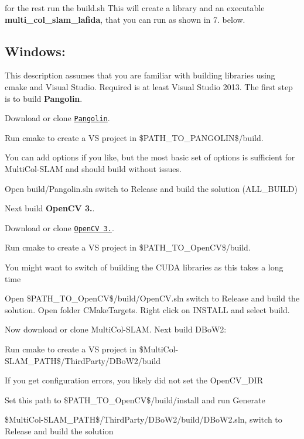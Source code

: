for the rest run the build.\+sh This will create a library and an executable {\bfseries multi\+\_\+col\+\_\+slam\+\_\+lafida}, that you can run as shown in 7. below.

\subsection*{Windows\+:}

This description assumes that you are familiar with building libraries using cmake and Visual Studio. Required is at least Visual Studio 2013. The first step is to build {\bfseries Pangolin}.
\begin{DoxyItemize}
\item Download or clone \href{https://github.com/stevenlovegrove/Pangolin}{\tt Pangolin}.
\item Run cmake to create a VS project in \$\+P\+A\+T\+H\+\_\+\+T\+O\+\_\+\+P\+A\+N\+G\+O\+L\+IN\$/build.
\item You can add options if you like, but the most basic set of options is sufficient for Multi\+Col-\/\+S\+L\+AM and should build without issues.
\item Open build/\+Pangolin.\+sln switch to Release and build the solution (A\+L\+L\+\_\+\+B\+U\+I\+LD)
\end{DoxyItemize}

Next build {\bfseries Open\+CV 3.}.
\begin{DoxyItemize}
\item Download or clone \href{https://github.com/opencv/opencv}{\tt Open\+CV 3.}.
\item Run cmake to create a VS project in \$\+P\+A\+T\+H\+\_\+\+T\+O\+\_\+\+Open\+CV\$/build.
\item You might want to switch of building the C\+U\+DA libraries as this takes a long time
\item Open \$\+P\+A\+T\+H\+\_\+\+T\+O\+\_\+\+Open\+CV\$/build/\+Open\+CV.sln switch to Release and build the solution. Open folder C\+Make\+Targets. Right click on I\+N\+S\+T\+A\+LL and select build.
\end{DoxyItemize}

Now download or clone Multi\+Col-\/\+S\+L\+AM. Next build D\+Bo\+W2\+:
\begin{DoxyItemize}
\item Run cmake to create a VS project in \$\+Multi\+Col-\/\+S\+L\+A\+M\+\_\+\+P\+A\+TH\$/\+Third\+Party/\+D\+Bo\+W2/build
\item If you get configuration errors, you likely did not set the Open\+C\+V\+\_\+\+D\+IR
\item Set this path to \$\+P\+A\+T\+H\+\_\+\+T\+O\+\_\+\+Open\+CV\$/build/install and run Generate
\item \$\+Multi\+Col-\/\+S\+L\+A\+M\+\_\+\+P\+A\+TH\$/\+Third\+Party/\+D\+Bo\+W2/build/\+D\+Bo\+W2.sln, switch to Release and build the solution
\end{DoxyItemize}


